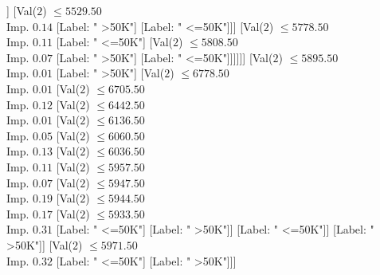 \documentclass[margin=10pt]{standalone}
\begin{document}
\begin{forest}
																																										[Label: " <=50K"]]
																																									[Val($2$) $ \leq 5529.50$ \\ Imp. $0.14$
																																										[Label: " >50K"]
																																										[Label: " <=50K"]]]
																																								[Val($2$) $ \leq 5778.50$ \\ Imp. $0.11$
																																									[Label: " <=50K"]
																																									[Val($2$) $ \leq 5808.50$ \\ Imp. $0.07$
																																										[Label: " >50K"]
																																										[Label: " <=50K"]]]]]]
																																					[Val($2$) $ \leq 5895.50$ \\ Imp. $0.01$
																																						[Label: " >50K"]
																																						[Val($2$) $ \leq 6778.50$ \\ Imp. $0.01$
																																							[Val($2$) $ \leq 6705.50$ \\ Imp. $0.12$
																																								[Val($2$) $ \leq 6442.50$ \\ Imp. $0.01$
																																									[Val($2$) $ \leq 6136.50$ \\ Imp. $0.05$
																																										[Val($2$) $ \leq 6060.50$ \\ Imp. $0.13$
																																											[Val($2$) $ \leq 6036.50$ \\ Imp. $0.11$
																																												[Val($2$) $ \leq 5957.50$ \\ Imp. $0.07$
																																													[Val($2$) $ \leq 5947.50$ \\ Imp. $0.19$
																																														[Val($2$) $ \leq 5944.50$ \\ Imp. $0.17$
																																															[Val($2$) $ \leq 5933.50$ \\ Imp. $0.31$
																																																[Label: " <=50K"]
																																																[Label: " >50K"]]
																																															[Label: " <=50K"]]
																																														[Label: " >50K"]]
																																													[Val($2$) $ \leq 5971.50$ \\ Imp. $0.32$
																																														[Label: " <=50K"]
																																														[Label: " >50K"]]]

\end{forest}
\end{document}
